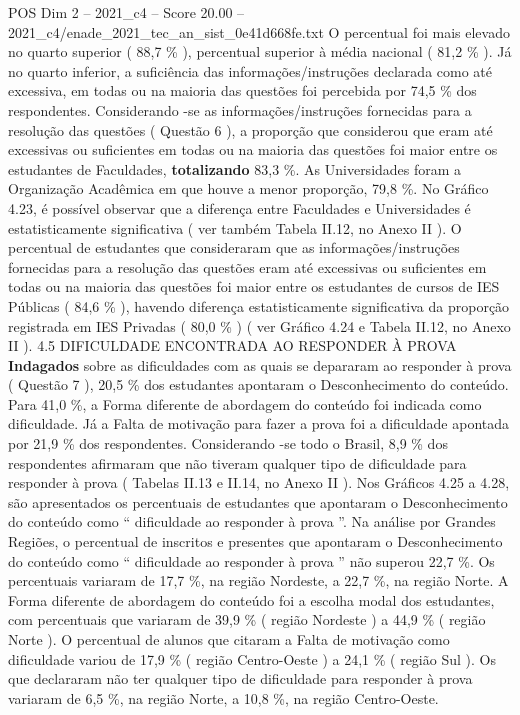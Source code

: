 \begin{textsample}{POS Dim 2 – 2021\_c4 – Score 20.00 – 2021\_c4/enade\_2021\_tec\_an\_sist\_0e41d668fe.txt}
O percentual foi mais elevado no quarto superior ( 88,7 \% ), percentual superior à média nacional ( 81,2 \% ).
Já no quarto inferior, a suficiência das informações/instruções declarada como até excessiva, em todas ou na maioria das questões foi percebida por 74,5 \% dos respondentes.
Considerando -se as informações/instruções fornecidas para a resolução das questões ( Questão 6 ), a proporção que considerou que eram até excessivas ou suficientes em todas ou na maioria das questões foi maior entre os estudantes de Faculdades, \textbf{totalizando} 83,3 \%.
As Universidades foram a Organização Acadêmica em que houve a menor proporção, 79,8 \%.
No Gráfico 4.23, é possível observar que a diferença entre Faculdades e Universidades é estatisticamente significativa ( ver também Tabela II.12, no Anexo II ).
O percentual de estudantes que consideraram que as informações/instruções fornecidas para a resolução das questões eram até excessivas ou suficientes em todas ou na maioria das questões foi maior entre os estudantes de cursos de IES Públicas ( 84,6 \% ), havendo diferença estatisticamente significativa da proporção registrada em IES Privadas ( 80,0 \% ) ( ver Gráfico 4.24 e Tabela II.12, no Anexo II ). 4.5 DIFICULDADE ENCONTRADA AO RESPONDER À PROVA \textbf{Indagados} sobre as dificuldades com as quais se depararam ao responder à prova ( Questão 7 ), 20,5 \% dos estudantes apontaram o Desconhecimento do conteúdo.
Para 41,0 \%, a Forma diferente de abordagem do conteúdo foi indicada como dificuldade.
Já a Falta de motivação para fazer a prova foi a dificuldade apontada por 21,9 \% dos respondentes.
Considerando -se todo o Brasil, 8,9 \% dos respondentes afirmaram que não tiveram qualquer tipo de dificuldade para responder à prova ( Tabelas II.13 e II.14, no Anexo II ).
Nos Gráficos 4.25 a 4.28, são apresentados os percentuais de estudantes que apontaram o Desconhecimento do conteúdo como “ dificuldade ao responder à prova ”.
Na análise por Grandes Regiões, o percentual de inscritos e presentes que apontaram o Desconhecimento do conteúdo como “ dificuldade ao responder à prova ” não superou 22,7 \%.
Os percentuais variaram de 17,7 \%, na região Nordeste, a 22,7 \%, na região Norte.
A Forma diferente de abordagem do conteúdo foi a escolha modal dos estudantes, com percentuais que variaram de 39,9 \% ( região Nordeste ) a 44,9 \% ( região Norte ).
O percentual de alunos que citaram a Falta de motivação como dificuldade variou de 17,9 \% ( região Centro-Oeste ) a 24,1 \% ( região Sul ).
Os que declararam não ter qualquer tipo de dificuldade para responder à prova variaram de 6,5 \%, na região Norte, a 10,8 \%, na região Centro-Oeste.

\end{textsample}
